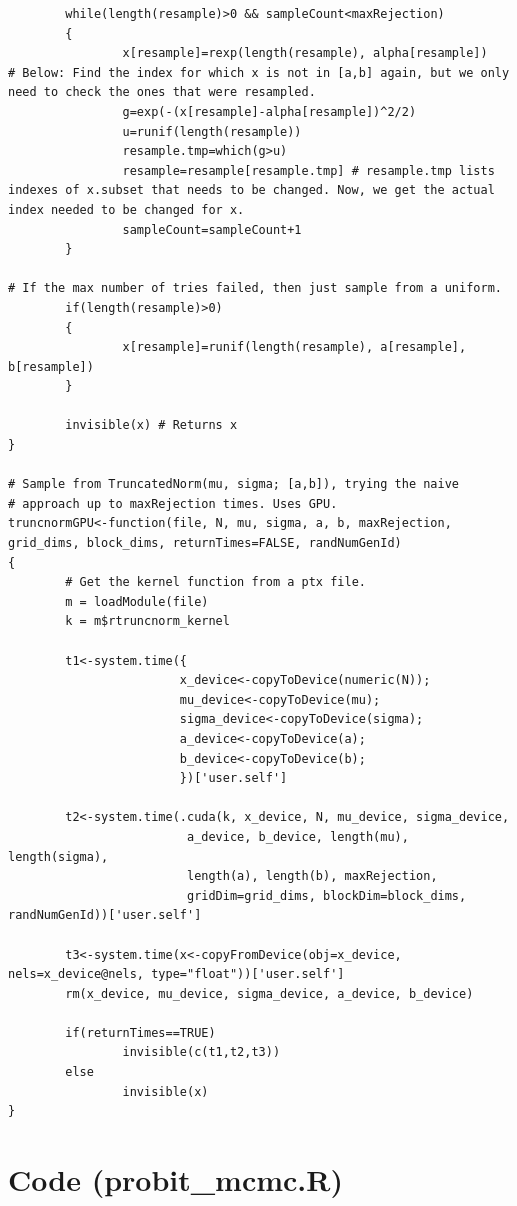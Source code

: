 \documentclass{article}
\begin{document}
\begin{verbatim}
        while(length(resample)>0 && sampleCount<maxRejection)
        {
                x[resample]=rexp(length(resample), alpha[resample])
# Below: Find the index for which x is not in [a,b] again, but we only need to check the ones that were resampled.
                g=exp(-(x[resample]-alpha[resample])^2/2)
                u=runif(length(resample))
                resample.tmp=which(g>u)
                resample=resample[resample.tmp] # resample.tmp lists indexes of x.subset that needs to be changed. Now, we get the actual index needed to be changed for x.
                sampleCount=sampleCount+1
        }

# If the max number of tries failed, then just sample from a uniform.
        if(length(resample)>0)
        {
                x[resample]=runif(length(resample), a[resample], b[resample])
        }

        invisible(x) # Returns x
}

# Sample from TruncatedNorm(mu, sigma; [a,b]), trying the naive
# approach up to maxRejection times. Uses GPU.
truncnormGPU<-function(file, N, mu, sigma, a, b, maxRejection, grid_dims, block_dims, returnTimes=FALSE, randNumGenId)
{
        # Get the kernel function from a ptx file.
        m = loadModule(file)
        k = m$rtruncnorm_kernel

        t1<-system.time({
                        x_device<-copyToDevice(numeric(N));
                        mu_device<-copyToDevice(mu);
                        sigma_device<-copyToDevice(sigma);
                        a_device<-copyToDevice(a);
                        b_device<-copyToDevice(b);
                        })['user.self']

        t2<-system.time(.cuda(k, x_device, N, mu_device, sigma_device,
                         a_device, b_device, length(mu), length(sigma),
                         length(a), length(b), maxRejection,
                         gridDim=grid_dims, blockDim=block_dims, randNumGenId))['user.self']

        t3<-system.time(x<-copyFromDevice(obj=x_device, nels=x_device@nels, type="float"))['user.self']
        rm(x_device, mu_device, sigma_device, a_device, b_device)

        if(returnTimes==TRUE)
                invisible(c(t1,t2,t3))
        else
                invisible(x)
}
\end{verbatim}

\section{Code (probit\_mcmc.R)}
\end{document}
